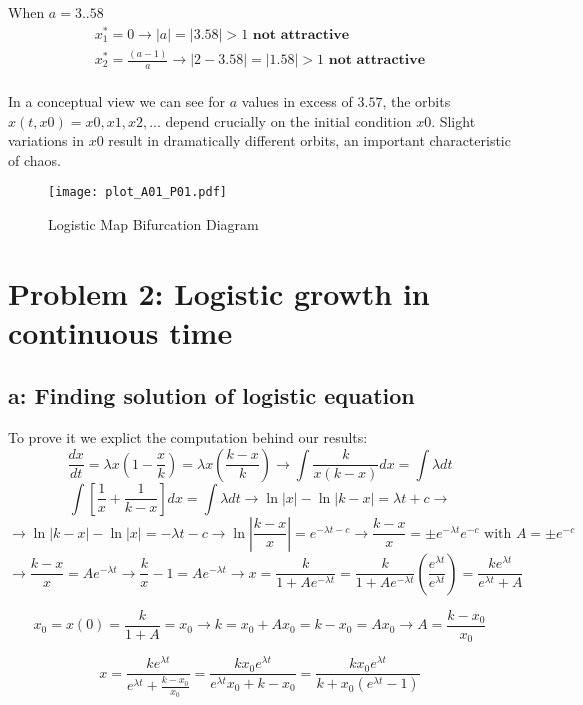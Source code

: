 When \textbf{$a = 3..58$} 
\begin{eqnarray}
x^*_1 = 0 \rightarrow |a| = |3.58| > 1 \textbf{ not attractive}\\
x^*_2 = \frac{(a-1)}{a}  \rightarrow |2-3.58|  = |1.58| > 1 \textbf{ not attractive}\\
\end{eqnarray}

In a conceptual view we can see for $a$ values in excess of $3.57$, the orbits $x(t, x0) = {x0, x1, x2, ... }$ depend crucially on the initial condition $x0$. Slight variations in $x0$ result in dramatically different orbits, an important characteristic of chaos.

\begin{figure}[h]
 \centering
    \texttt{[image: plot\_A01\_P01.pdf]}
    \caption{Logistic Map Bifurcation Diagram}
	\label{fig:plot_logistic_map_bifgraph}
\end{figure}


\setcounter{chapter}{2}
\setcounter{section}{0}
\section{Problem 2: Logistic growth in continuous time}
\subsection{a: Finding solution of logistic equation}

To prove it we explict the computation behind our results:
\[\frac{dx}{dt} = \lambda x (1-\frac{x}{k}) = \lambda x (\frac{k-x}{k}) \rightarrow \int \frac{k}{x(k-x)}dx = \int \lambda dt \]
\[ \int [ \frac{1}{x} + \frac{1}{k-x}]dx = \int \lambda dt \rightarrow \ln |x| - \ln |k-x| = \lambda t + c \rightarrow \]
\[ \rightarrow \ln |k-x| - \ln |x| = -\lambda t - c \rightarrow \ln | \frac{k-x}{x} | = e^{-\lambda t -c} \rightarrow \frac{k-x}{x} = \pm e^{-\lambda t}e^{-c} \text{ with } A = \pm e^{-c} \]
\[ \rightarrow \frac{k-x}{x} = Ae^{-\lambda t} \rightarrow \frac{k}{x} -1 = Ae^{-\lambda t} \rightarrow x = \frac{k}{1+Ae^{-\lambda t}} = \frac{k}{1+Ae^{-\lambda t}}(\frac{e^{\lambda t}}{e^{\lambda t}}) = \frac{ke^{\lambda t}}{e^{\lambda t}+A} \]

\[ x_0 = x(0) = \frac{k}{1+A} = x_0 \rightarrow k = x_0 + Ax_0 = k-x_0 = Ax_0 \rightarrow A = \frac{k-x_0}{x_0} \]

\[ x = \frac{ke^{\lambda t}}{e^{\lambda t} + \frac{k-x_0}{x_0}} = \frac{kx_0e^{\lambda t}}{e^{\lambda t}x_0+k-x_0} = \frac{kx_0e^{\lambda t}}{k+x_0(e^{\lambda t} -1)} \]




